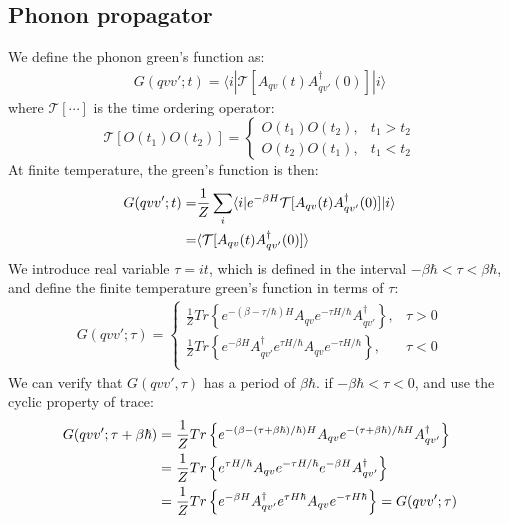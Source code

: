 \documentclass{article}
\begin{document}
\subsection{Phonon propagator}
We define the phonon green's function as:
\begin{align}
    G(qvv';t) = \langle i | \mathcal{T}[A_{qv}(t)A_{qv'}^{\dagger}(0)]| i \rangle \label{green_A}
\end{align}
where $\mathcal{T}[\cdots]$ is the time ordering operator:
\begin{equation}
    \mathcal{T}[O(t_1)O(t_2)] = 
    \begin{cases}
        O(t_1)O(t_2), &t_1 > t_2\\
        O(t_2)O(t_1), &t_1 < t_2 
    \end{cases}
\end{equation}
At finite temperature, the green's function is then:
\begin{align}
    G(qvv';t) =& \frac{1}{Z} \sum_i \langle i | e^{-\beta H} \mathcal{T}[A_{qv}(t)A_{qv'}^{\dagger}(0)]| i \rangle \notag \\
              =& \langle \mathcal{T}[A_{qv}(t)A_{qv'}^{\dagger}(0)] \rangle
\end{align}
We introduce real variable $\tau = it $, which is defined in the interval $-\beta \hbar < \tau < \beta \hbar$, and define the 
finite temperature green's function in terms of $\tau$:
\begin{align}
    G(qvv';\tau) = 
    \begin{cases}
        \frac{1}{Z} Tr\left\{ e^{-(\beta-\tau/\hbar)H} A_{qv} e^{-\tau H/\hbar } A_{qv'}^{\dagger} \right\}, &\tau > 0 \\
        \frac{1}{Z} Tr\left\{ e^{-\beta H} A_{qv'}^{\dagger} e^{\tau H/\hbar } A_{qv} e^{- \tau H/\hbar } \right\}, &\tau < 0 \\
    \end{cases}
\end{align}
We can verify that $G(qvv',\tau)$ has a period of $\beta \hbar$. if $-\beta \hbar < \tau < 0$, and use the cyclic property 
of trace:
\begin{align}
    G(qvv';\tau + \beta \hbar) &= \frac{1}{Z} Tr\left\{ e^{-(\beta-(\tau + \beta \hbar)/\hbar)H} A_{qv} e^{-(\tau + \beta \hbar)/\hbar H} A_{qv'}^{\dagger} \right\} \notag \\
                                &= \frac{1}{Z} Tr\left\{ e^{\tau H/\hbar} A_{qv} e^{-\tau H /\hbar} e^{-\beta H} A_{qv'}^{\dagger} \right\} \notag \\
                                &= \frac{1}{Z} Tr\left\{ e^{-\beta H} A_{qv'}^{\dagger} e^{\tau H\hbar } A_{qv} e^{-\tau H\hbar } \right\} = G(qvv';\tau ) 
\end{align}
\end{document}
